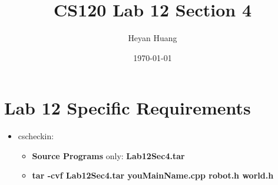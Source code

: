 \documentclass[presentation]{beamer}
\author{Heyan Huang}
\date{\today}
\title{CS120 Lab \textbf{12} Section \textbf{4}}
\begin{document}
\maketitle

\section{Lab 12 Specific Requirements}
\label{sec-1}
\begin{itemize}
\item cscheckin: 
\begin{itemize}
\item \textbf{Source Programs} only: \textbf{Lab12Sec4.tar}
\item \textbf{tar -cvf Lab12Sec4.tar youMainName.cpp robot.h world.h}
\end{itemize}
\end{itemize}
\end{document}
